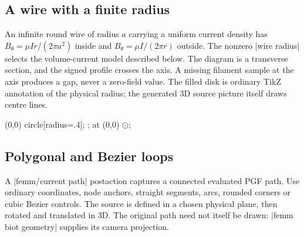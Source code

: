 \subsection{A wire with a finite radius}
An infinite round wire of radius $a$ carrying a uniform current density has
$B_\theta=\mu I r/(2\pi a^2)$ inside and $B_\theta=\mu I/(2\pi r)$ outside.
The nonzero |wire radius| selects the volume-current model described below.
The diagram is a transverse section, and the signed profile crosses the axis.
A missing filament sample at the axis produces a gap, never a zero-field value.
The filled disk is ordinary TikZ annotation of the physical radius; the generated
3D source picture itself draws centre lines.
\begin{codeexample}[width=0pt]
\begingroup
\tikzpicture[femm/biot,
 femm/biot view={azimuth=0,elevation=90,xmin=-1.5,xmax=1.5,
 ymin=-1.5,ymax=1.5,zmin=-1,zmax=1,
 seeds={.2/0/0;.6/0/0;1.1/0/0},step=.08}]
 \femmbiotsource[kind=wire,extent=infinite,current=3,wire radius=.4]
 \femmbiotprofile[name=thick-wire,from=-1.4/0/0,to=1.4/0/0,samples=141]
 \filldraw[fill=orange!15,draw=orange!75!black] (0,0) circle[radius=.4];
 ;
 \node at (0,0) {$\odot$};
\endtikzpicture
{}
 \femmbiotsource[kind=wire,extent=infinite,current=3]
 \femmbiotprofile[name=thin-wire,from=-1.4/0/0,to=1.4/0/0,samples=141]
\endtikzpicture
\par
\tikzpicture
 \axis[width=8cm,height=5cm,no markers,grid=major,
 xlabel={$x$ (cm)},ylabel={$B_y$ (T)},ymin=-.0003,ymax=.0003,
 legend pos=north west]
  \femmbiotplot[profile=thick-wire,component=By,abscissa=x,
   plot options={blue!70!black,thick}]
  \femmbiotplot[profile=thin-wire,component=By,abscissa=x,
   plot options={orange!80!black,dashed}]
 \endaxis
\endtikzpicture
\par
\endgroup
\end{codeexample}

\subsection{Polygonal and Bezier loops}
A |femm/current path| postaction captures a connected evaluated PGF path.
Use ordinary coordinates, node anchors, straight segments, arcs, rounded corners
or cubic Bezier controls. The source is defined in a chosen physical plane,
then rotated and translated in 3D. The original path need not itself be drawn:
|femm biot geometry| supplies its camera projection.

